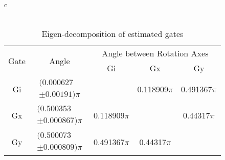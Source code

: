 \documentclass{beamer}
\begin{document}
\begin{frame}
\begin{table}[h]
\begin{center}
{\begin{tabular}{c}
\\
\vspace{2em}
\\
\begin{tabular}[l]{|c|c|c|c|c|}
\hline
\multirow{2}{*}{Gate} & \multirow{2}{*}{Angle} & \multicolumn{3}{c|}{Angle between Rotation Axes} \\ \cline{3-5}
 & & Gi & Gx & Gy \\ \hline
Gi & $ \begin{array}{c}(0.000627 \\ \pm 0.00191)\pi \end{array} $ &  & 0.118909$\pi$ & 0.491367$\pi$ \\ \hline
Gx & $ \begin{array}{c}(0.500353 \\ \pm 0.000867)\pi \end{array} $ & 0.118909$\pi$ &  & 0.44317$\pi$ \\ \hline
Gy & $ \begin{array}{c}(0.500073 \\ \pm 0.000809)\pi \end{array} $ & 0.491367$\pi$ & 0.44317$\pi$ &  \\ \hline
\end{tabular}

\end{tabular}
}
\caption{Eigen-decomposition of estimated gates}
\end{center}
\end{table}

\end{frame}
\end{document}
